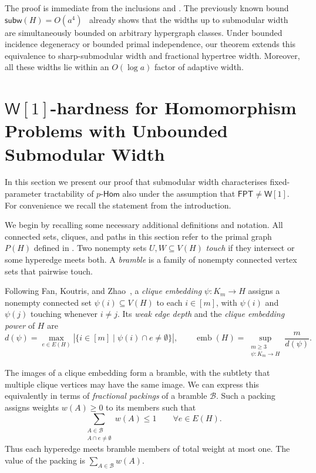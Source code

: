 \documentclass[11pt,letterpaper]{article}
\theoremstyle{definition}
\theoremstyle{remark}
\newcommand{\pHom}{p\text{-}\mathsf{Hom}}
\newcommand{\subw}{\mathsf{subw}}
\newcommand{\FPT}{\ensuremath{\mathsf{FPT}}}
\newcommand{\emb}{\operatorname{emb}}
\newcommand{\wone}{\ensuremath{\mathsf{W}[1]}}
\providecommand{\subw}{\operatorname{subw}}
\providecommand{\FPT}{\ensuremath{\mathsf{FPT}}}
\begin{document}
The proof is immediate from the inclusions and .
The previously known bound $\subw(H)=O(a^4)$~\cite{Marx13} already shows
that the widths up to submodular width are simultaneously bounded on
arbitrary hypergraph classes. Under bounded incidence degeneracy or
bounded primal independence, our theorem extends this equivalence to
sharp-submodular width and fractional hypertree width. Moreover, all
these widths lie within an $O(\log a)$ factor of adaptive width.

%
\section{\wone-hardness for Homomorphism Problems with Unbounded Submodular Width}
\label{sec:ethsave}

In this section we present our proof that submodular width characterises fixed-parameter tractability of $\pHom$ also under the assumption that $\FPT \ne \wone$. For convenience we recall the statement from the introduction.

\wonehardnesstheorem*

We begin by recalling some necessary additional definitions and notation.
All connected sets, cliques, and paths in this section refer to the primal graph $P(H)$ defined in .
Two nonempty sets $U,W\subseteq V(H)$ \emph{touch} if they intersect or some hyperedge meets both. A \emph{bramble} is a family of nonempty connected vertex sets that pairwise touch.

Following Fan, Koutris, and Zhao~\cite{stocCliqueEmbedding2023}, a \emph{clique embedding} $\psi:K_m\to H$ assigns a nonempty connected
set $\psi(i)\subseteq V(H)$ to each $i\in[m]$, with $\psi(i)$ and $\psi(j)$
touching whenever $i\ne j$.  Its \emph{weak edge depth}
and the \emph{clique embedding power} of $H$ are
\begin{equation}\label{eq:embedding-power}
 d(\psi)=\max_{e\in E(H)}|\{i\in[m]\mid \psi(i)\cap e\ne\emptyset\}|,
 \qquad
 \emb(H)=\sup_{\substack{m\ge3\\\psi:K_m\to H}}\frac{m}{d(\psi)}.
\end{equation}


The images of a clique embedding form a bramble, with the subtlety that multiple clique vertices may have the same image. We can express this equivalently in terms of \emph{fractional packings} of a bramble $\mathcal B$. Such a packing assigns weights $w(A)\ge0$ to its
members such that
\[
 \sum_{\substack{A\in\mathcal B\\A\cap e\ne\emptyset}}w(A)\le1
 \qquad \forall e\in E(H).
\]
Thus each hyperedge meets bramble members of total weight at most one.
The value of the packing is $\sum_{A\in\mathcal B}w(A)$.
\end{document}
